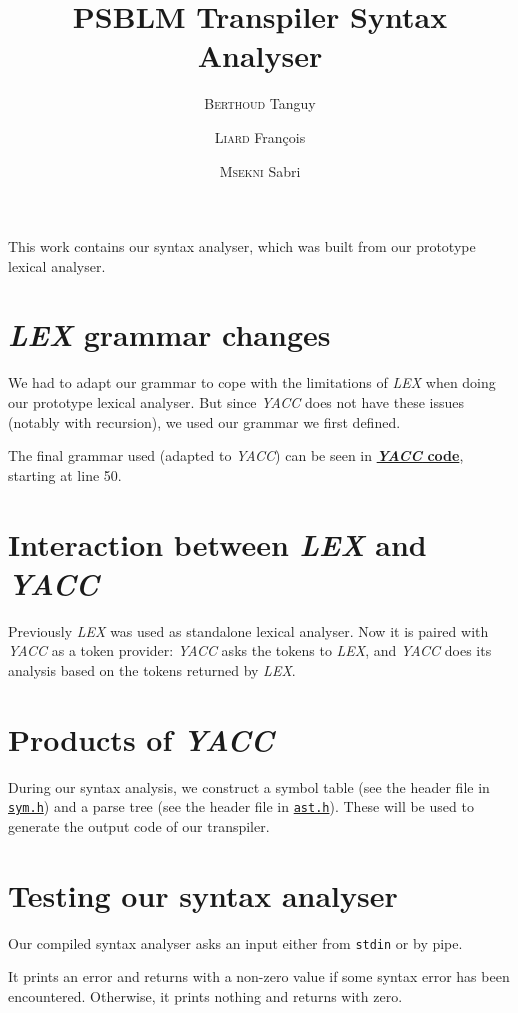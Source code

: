 \documentclass[a4paper,12pt,notitlepage,english]{article}
\title{\textbf{PSBLM} Transpiler Syntax Analyser}
\author{\textsc{Berthoud} Tanguy \and \textsc{Liard} François \and \textsc{Msekni} Sabri}
\begin{document}
	\maketitle

	This work contains our syntax analyser, which was built from our prototype lexical analyser.

	\section{\emph{LEX} grammar changes}

	We had to adapt our grammar to cope with the limitations of \emph{LEX} when doing our prototype lexical analyser.
	But since \emph{YACC} does not have these issues (notably with recursion), we used our grammar we first defined.

	The final grammar used (adapted to \emph{YACC}) can be seen in \hyperref[sec:lst-yacc]{\bfseries \emph{YACC} code}, starting at line 50.

	\section{Interaction between \emph{LEX} and \emph{YACC}}

	Previously \emph{LEX} was used as standalone lexical analyser.
	Now it is paired with \emph{YACC} as a token provider: \emph{YACC} asks the tokens to \emph{LEX}, and \emph{YACC} does its analysis based on the tokens returned by \emph{LEX}.

	\section{Products of \emph{YACC}}

	During our syntax analysis, we construct a symbol table (see the header file in \hyperref[sec:lst-sym]{\texttt{sym.h}}) and a parse tree (see the header file in \hyperref[sec:lst-ast]{\texttt{ast.h}}).
	These will be used to generate the output code of our transpiler.

	\section{Testing our syntax analyser}

	Our compiled syntax analyser asks an input either from \texttt{stdin} or by pipe.

	It prints an error and returns with a non-zero value if some syntax error has been encountered.
	Otherwise, it prints nothing and returns with zero.
\end{document}
